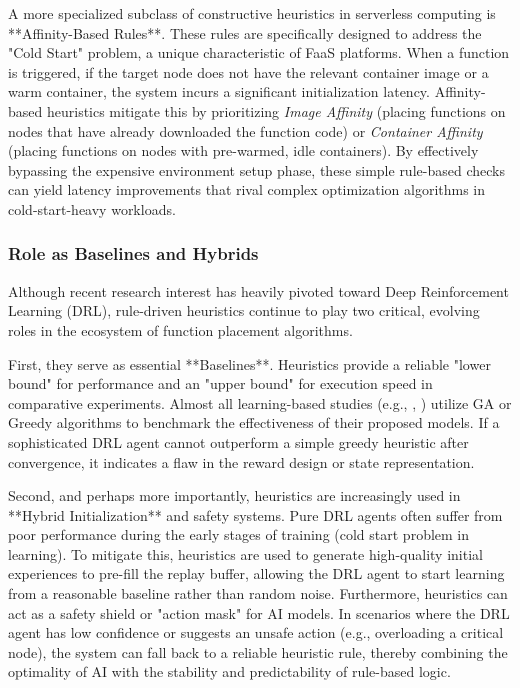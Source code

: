 \documentclass[lettersize,journal]{IEEEtran}
\begin{document}
A more specialized subclass of constructive heuristics in serverless computing is **Affinity-Based Rules**. These rules are specifically designed to address the "Cold Start" problem, a unique characteristic of FaaS platforms. When a function is triggered, if the target node does not have the relevant container image or a warm container, the system incurs a significant initialization latency. Affinity-based heuristics mitigate this by prioritizing \textit{Image Affinity} (placing functions on nodes that have already downloaded the function code) or \textit{Container Affinity} (placing functions on nodes with pre-warmed, idle containers). By effectively bypassing the expensive environment setup phase, these simple rule-based checks can yield latency improvements that rival complex optimization algorithms in cold-start-heavy workloads.

\subsubsection{Role as Baselines and Hybrids}
Although recent research interest has heavily pivoted toward Deep Reinforcement Learning (DRL), rule-driven heuristics continue to play two critical, evolving roles in the ecosystem of function placement algorithms.

First, they serve as essential **Baselines**. Heuristics provide a reliable "lower bound" for performance and an "upper bound" for execution speed in comparative experiments. Almost all learning-based studies (e.g., \cite{xu2021DSOAC}, \cite{li2020Proximal}) utilize GA or Greedy algorithms to benchmark the effectiveness of their proposed models. If a sophisticated DRL agent cannot outperform a simple greedy heuristic after convergence, it indicates a flaw in the reward design or state representation.

Second, and perhaps more importantly, heuristics are increasingly used in **Hybrid Initialization** and safety systems. Pure DRL agents often suffer from poor performance during the early stages of training (cold start problem in learning). To mitigate this, heuristics are used to generate high-quality initial experiences to pre-fill the replay buffer, allowing the DRL agent to start learning from a reasonable baseline rather than random noise. Furthermore, heuristics can act as a safety shield or "action mask" for AI models. In scenarios where the DRL agent has low confidence or suggests an unsafe action (e.g., overloading a critical node), the system can fall back to a reliable heuristic rule, thereby combining the optimality of AI with the stability and predictability of rule-based logic.
\end{document}
